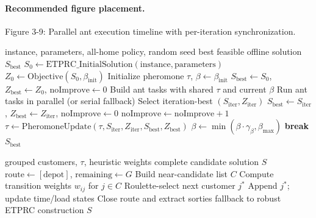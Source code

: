 \documentclass[review,12pt]{elsarticle}
\begin{document}
\paragraph{Recommended figure placement.}
Figure 3-9: Parallel ant execution timeline with per-iteration synchronization.

\begin{algorithm}[t]
\caption{Overall Offline Optimization (ACO + ALNS)}
\label{alg:overall_offline}
\begin{algorithmic}[1]
\Require instance, parameters, all-home policy, random seed
\Ensure best feasible offline solution \(S_{\mathrm{best}}\)
\State \(S_0 \gets \mathrm{ETPRC\_InitialSolution}(\mathrm{instance}, \mathrm{parameters})\)
\State \(Z_0 \gets \mathrm{Objective}(S_0,\beta_{\mathrm{init}})\)
\State Initialize pheromone \(\tau\), \(\beta \gets \beta_{\mathrm{init}}\)
\State \(S_{\mathrm{best}} \gets S_0\), \(Z_{\mathrm{best}} \gets Z_0\), \(\mathrm{noImprove}\gets 0\)
  \State Build ant tasks with shared \(\tau\) and current \(\beta\)
  \State Run ant tasks in parallel (or serial fallback)
  \State Select iteration-best \((S_{\mathrm{iter}}, Z_{\mathrm{iter}})\)
    \State \(S_{\mathrm{best}} \gets S_{\mathrm{iter}}\), \(Z_{\mathrm{best}} \gets Z_{\mathrm{iter}}\), \(\mathrm{noImprove}\gets 0\)
  \Else
    \State \(\mathrm{noImprove}\gets \mathrm{noImprove}+1\)
  \EndIf
  \State \(\tau \gets \mathrm{PheromoneUpdate}(\tau, S_{\mathrm{iter}}, Z_{\mathrm{iter}}, S_{\mathrm{best}}, Z_{\mathrm{best}})\)
  \State \(\beta \gets \min(\beta\cdot \gamma_\beta,\beta_{\max})\)
   \State \textbf{break} \EndIf
\EndFor
\State \Return \(S_{\mathrm{best}}\)
\end{algorithmic}
\end{algorithm}

\begin{algorithm}[t]
\caption{ACO Constructive Procedure}
\label{alg:aco_construct}
\begin{algorithmic}[1]
\Require grouped customers, \(\tau\), heuristic weights
\Ensure complete candidate solution \(S\)
  \State \(\mathrm{route}\gets[\mathrm{depot}]\), \(\mathrm{remaining}\gets G\)
    \State Build near-candidate list \(C\)
    \State Compute transition weights \(w_{ij}\) for \(j\in C\)
    \State Roulette-select next customer \(j^\ast\)
    \State Append \(j^\ast\); update time/load states
  \EndWhile
  \State Close route and extract sorties
\EndFor
{}
  \State fallback to robust ETPRC construction
\EndIf
\State \Return \(S\)
\end{algorithmic}
\end{algorithm}
\end{document}
